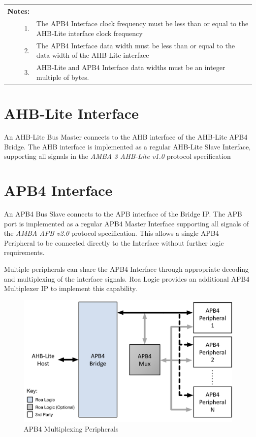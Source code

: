 \begin{longtable}[]{@{}|rp{12cm}@{}}
	\textbf{Notes:} & \tabularnewline
	\endhead
	1. & The APB4 Interface clock frequency must be less than or equal 
	to the AHB-Lite interface clock frequency\\
	2. & The APB4 Interface data width must be less than or equal to 
	the data width of the AHB-Lite interface\\
	3. & AHB-Lite and APB4 Interface data widths must be an integer 
	multiple of bytes.\\
\end{longtable}

	
\section{AHB-Lite Interface}\label{ahb-lite-interface}

An AHB-Lite Bus Master connects to the AHB interface of the AHB-Lite
APB4 Bridge. The AHB interface is implemented as a regular AHB-Lite
Slave Interface, supporting all signals in the \emph{AMBA 3 AHB-Lite
v1.0} protocol specification

\section{APB4 Interface}\label{apb4-interface}

An APB4 Bus Slave connects to the APB interface of the Bridge IP. The
APB port is implemented as a regular APB4 Master Interface supporting
all signals of the \emph{AMBA APB v2.0} protocol specification. This
allows a single APB4 Peripheral to be connected directly to the
Interface without further logic requirements.

Multiple peripherals can share the APB4 Interface through appropriate
decoding and multiplexing of the interface signals. Roa Logic provides
an additional APB4 Multiplexer IP to implement this capability.

\begin{figure}[tbh]
	\centering
	\includegraphics{assets/img/apb4-bridge-sys.png}
	\caption{APB4 Multiplexing Peripherals}
	\label{fig:apb4-bridge-sys2}
\end{figure}